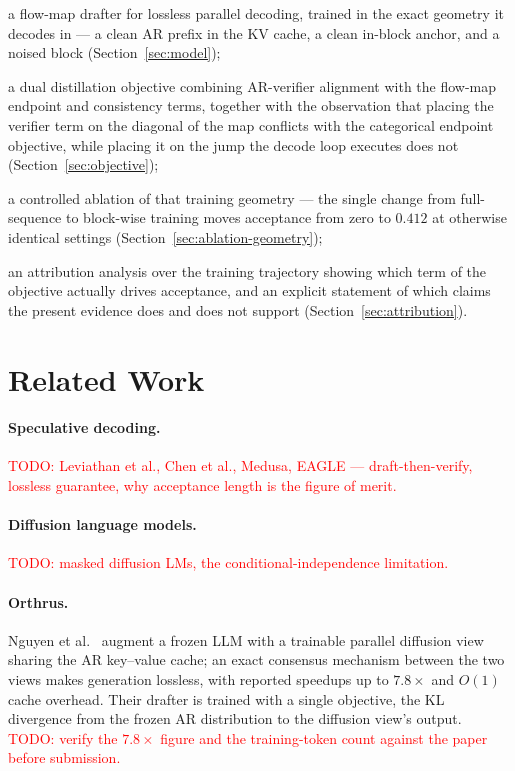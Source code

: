 \documentclass{zapiski}
\newcommand{\cm}[1]{\textcolor{red}{#1}}
\begin{document}
\begin{compactenum}
\item a flow-map drafter for lossless parallel decoding, trained in the exact
geometry it decodes in --- a clean AR prefix in the KV cache, a clean in-block
anchor, and a noised block (Section~\ref{sec:model});
\item a dual distillation objective combining AR-verifier alignment with the
flow-map endpoint and consistency terms, together with the observation that
placing the verifier term on the diagonal of the map conflicts with the
categorical endpoint objective, while placing it on the jump the decode loop
executes does not (Section~\ref{sec:objective});
\item a controlled ablation of that training geometry --- the single change
from full-sequence to block-wise training moves acceptance from zero to
$0.412$ at otherwise identical settings (Section~\ref{sec:ablation-geometry});
\item an attribution analysis over the training trajectory showing which term
of the objective actually drives acceptance, and an explicit statement of which
claims the present evidence does and does not support
(Section~\ref{sec:attribution}).
\end{compactenum}

\section{Related Work}
\label{sec:related}

\paragraph{Speculative decoding.} \cm{TODO: Leviathan et al., Chen et al.,
Medusa, EAGLE --- draft-then-verify, lossless guarantee, why acceptance length
is the figure of merit.}

\paragraph{Diffusion language models.} \cm{TODO: masked diffusion LMs, the
conditional-independence limitation.}

\paragraph{Orthrus.} Nguyen et al.~\cite{nguyen2026orthrus} augment a frozen
LLM with a trainable parallel diffusion view sharing the AR key--value cache;
an exact consensus mechanism between the two views makes generation lossless,
with reported speedups up to $7.8\times$ and $O(1)$ cache overhead. Their
drafter is trained with a single objective, the KL divergence from the frozen
AR distribution to the diffusion view's output. \cm{TODO: verify the $7.8\times$
figure and the training-token count against the paper before submission.}
\end{document}
